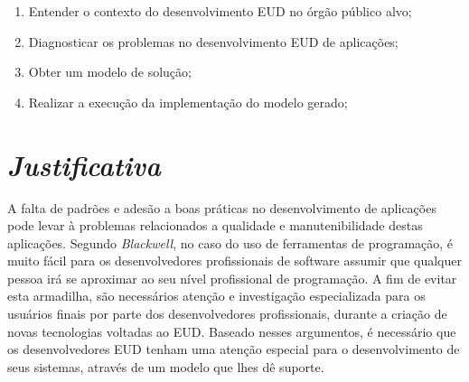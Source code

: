 \begin{enumerate}
	\item Entender o contexto do desenvolvimento EUD no órgão público alvo;
	\item Diagnosticar os problemas no desenvolvimento EUD de aplicações;
    \item Obter um modelo de solução;
    \item Realizar a execução da implementação do modelo gerado;
\end{enumerate}

\section{\textit{Justificativa}}

A falta de padrões e adesão a boas práticas no desenvolvimento de aplicações pode levar à problemas relacionados a qualidade e manutenibilidade destas aplicações. Segundo \textit{Blackwell}, no caso do uso de ferramentas de programação, é muito fácil para os desenvolvedores profissionais de software assumir que qualquer pessoa irá se aproximar ao seu nível profissional de programação. A fim de evitar esta armadilha, são necessários atenção e investigação especializada para os usuários finais por parte dos desenvolvedores profissionais, durante a criação de novas tecnologias voltadas ao EUD. Baseado nesses argumentos, é necessário que os desenvolvedores EUD tenham uma atenção especial para o desenvolvimento de seus sistemas, através de um modelo que lhes dê suporte.

